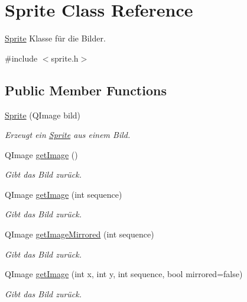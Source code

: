 \hypertarget{class_sprite}{}\section{Sprite Class Reference}
\label{class_sprite}


\hyperlink{class_sprite}{Sprite} Klasse für die Bilder.  




{\ttfamily \#include $<$sprite.\+h$>$}

\subsection*{Public Member Functions}
\begin{DoxyCompactItemize}
\item 
\hyperlink{class_sprite_a247eff7723c39ee82ba183e975f644dd}{Sprite} (Q\+Image bild)
\begin{DoxyCompactList}\small\item\em Erzeugt ein \hyperlink{class_sprite}{Sprite} aus einem Bild. \end{DoxyCompactList}\item 
Q\+Image \hyperlink{class_sprite_a37b20fb41171754d6cc893a1efe9cea8}{get\+Image} ()
\begin{DoxyCompactList}\small\item\em Gibt das Bild zurück. \end{DoxyCompactList}\item 
Q\+Image \hyperlink{class_sprite_ad225df2276134a2374a2e6a751a9beeb}{get\+Image} (int sequence)
\begin{DoxyCompactList}\small\item\em Gibt das Bild zurück. \end{DoxyCompactList}\item 
Q\+Image \hyperlink{class_sprite_a791c9dfd90379dfcc2466b0049b41967}{get\+Image\+Mirrored} (int sequence)
\begin{DoxyCompactList}\small\item\em Gibt das Bild zurück. \end{DoxyCompactList}\item 
Q\+Image \hyperlink{class_sprite_abd18da77e4c85a62bbbcbca6bcf40463}{get\+Image} (int x, int y, int sequence, bool mirrored=false)
\begin{DoxyCompactList}\small\item\em Gibt das Bild zurück. \end{DoxyCompactList}\end{DoxyCompactItemize}


